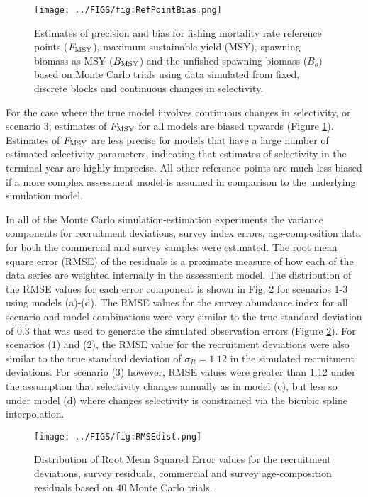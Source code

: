 \begin{figure}[!tbh]
	\begin{center}
		\texttt{[image: ../FIGS/fig:RefPointBias.png]}
	\end{center}
	\caption{Estimates of precision and bias for fishing mortality rate reference points ($F_{\rm{MSY}}$), maximum sustainable yield (MSY), spawning biomass as MSY ($B_{\rm{MSY}}$) and the unfished spawning biomass ($B_o$) based on Monte Carlo trials using data simulated from fixed, discrete blocks and continuous changes in selectivity. }
	\label{fig:RefPointBias}
\end{figure}

For the case where the true model involves continuous changes in selectivity, or scenario 3, estimates of $F_{\rm{MSY}}$ for all models are biased upwards (Figure \ref{fig:RefPointBias}).  Estimates of $F_{\rm{MSY}}$ are less precise for models that have a large number of estimated selectivity parameters, indicating that estimates of selectivity in the terminal year are highly imprecise. All other reference points are much less biased if a more complex assessment model is assumed in comparison to the underlying simulation model.


In all of the Monte Carlo simulation-estimation experiments the variance components for recruitment deviations, survey index errors, age-composition data for both the commercial and survey samples were estimated.  The root mean square error (RMSE) of the residuals is a proximate measure of how each of the data series are weighted internally in the assessment model.   The distribution of the RMSE values for each error component is shown in Fig. \ref{fig:RMSEdist} for scenarios 1-3 using models (a)-(d).  The RMSE values for the survey abundance index for all scenario and model combinations were very similar to the true standard deviation of 0.3 that was used to generate the simulated observation errors (Figure \ref{fig:RMSEdist}).   For scenarios (1) and (2), the RMSE value for the recruitment deviations were also similar to the true standard deviation of $\sigma_R=1.12$ in the simulated recruitment deviations.  For scenario (3) however, RMSE values were greater than 1.12 under the assumption that selectivity changes annually  as in model (c), but less so under model (d) where changes selectivity is constrained via the bicubic spline interpolation.

\begin{figure}[!tbh]
	\begin{center}
		\texttt{[image: ../FIGS/fig:RMSEdist.png]}
	\end{center}
	\caption{Distribution of Root Mean Squared Error values for the recruitment deviations, survey residuals, commercial and survey age-composition residuals based on 40 Monte Carlo trials.}
	\label{fig:RMSEdist}
\end{figure}

